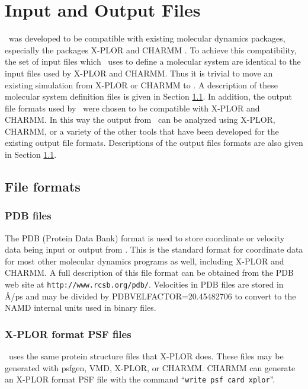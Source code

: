 
\section{Input and Output Files}
\label{section:files}

\NAMD\ was developed to be compatible with existing 
molecular dynamics packages, 
especially the packages X-PLOR 
and CHARMM .  
To achieve this compatibility,
the set of input files which \NAMD\ uses to define 
a molecular system are identical to the input files used by X-PLOR and CHARMM.  
Thus it is trivial to move an existing simulation from
X-PLOR or CHARMM to \NAMD.
A description of these molecular system definition 
files is given in Section \ref{section:formats}.  
\prettypar
In addition, the output file formats used by \NAMD\ 
were chosen to be compatible with X-PLOR and CHARMM.  
In this way the output from \NAMD\ can be analyzed using
X-PLOR, CHARMM, or a variety of the other tools that have 
been developed for the existing output file formats.  
Descriptions of the output files formats are also given in 
Section \ref{section:formats}.


\subsection{File formats}
\label{section:formats}

\subsubsection{PDB files}
The PDB (Protein Data Bank) format is used to store coordinate or velocity data 
being input or output from \NAMD.
This is the standard format for coordinate data
for most other molecular dynamics programs as well, including X-PLOR and CHARMM.
A full description of this file format can be obtained from the PDB web site
at {\tt http://www.rcsb.org/pdb/}.
Velocities in PDB files are stored in \AA/ps and may be
divided by PDBVELFACTOR=20.45482706
to convert to the NAMD internal units used in binary files.

\subsubsection{X-PLOR format PSF files}

\NAMD\ uses the same protein structure files that X-PLOR does.
These files may be generated with psfgen, VMD, X-PLOR, or CHARMM.
CHARMM can generate an X-PLOR format PSF file with the command
``{\tt write psf card xplor}''.

